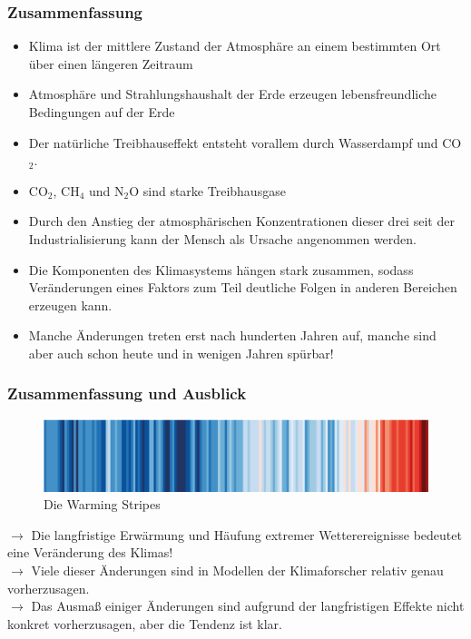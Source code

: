 \begin{frame}
	\frametitle{Zusammenfassung}
	\begin{itemize}
		\item Klima ist der mittlere Zustand der Atmosphäre an einem bestimmten Ort über einen längeren Zeitraum
		\item Atmosphäre und Strahlungshaushalt der Erde erzeugen lebensfreundliche Bedingungen auf der Erde
		\item Der natürliche Treibhauseffekt entsteht vorallem durch Wasserdampf und CO$_2$.
		\item CO$_2$, CH$_4$ und N$_2$O sind starke Treibhausgase
		\item Durch den Anstieg der atmosphärischen Konzentrationen dieser drei seit der Industrialisierung kann der Mensch als Ursache angenommen werden.
		\item Die Komponenten des Klimasystems hängen stark zusammen, sodass Veränderungen eines Faktors zum Teil deutliche Folgen in anderen Bereichen erzeugen kann.
		\item Manche Änderungen treten erst nach hunderten Jahren auf, manche sind aber auch schon heute und in wenigen Jahren spürbar!
	\end{itemize}
\end{frame}

\begin{frame}
	\frametitle{Zusammenfassung und Ausblick}
	\begin{figure}
		\centering
		\includegraphics[width=\linewidth]{bilder/s4f-warming-stripes}
		\caption{Die Warming Stripes}
	\end{figure}
	$\rightarrow$ Die langfristige Erwärmung und Häufung extremer Wetterereignisse bedeutet eine Veränderung des Klimas!\\
	$\rightarrow$ Viele dieser Änderungen sind in Modellen der Klimaforscher relativ genau vorherzusagen. \\
	$\rightarrow$ Das Ausmaß einiger Änderungen sind aufgrund der langfristigen Effekte nicht konkret vorherzusagen, aber die Tendenz ist klar.
\end{frame}

